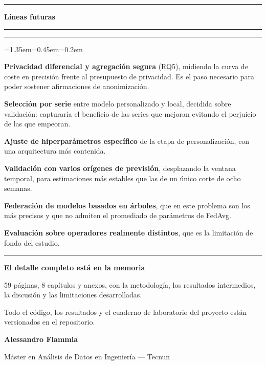 \documentclass[12pt]{article}
\newcommand{\seccionActual}{}
\newcommand{\diapo}[2]{%
  \typeout{MEDIDA pagina \thepage: usado=\the\pagetotal\space de \the\pagegoal}%
  \clearpage
  \renewcommand{\seccionActual}{#1}%
  {\color{azul}\rule{2.4cm}{2pt}}\par\vspace{0.38em}
  {\fontsize{18}{21}\selectfont\bfseries\color{tinta}#2}\par\vspace{0.3em}
  {\color{regla}\rule{\linewidth}{0.4pt}}\par\vspace{0.7em}
}
\newenvironment{puntos}[1][11.5]{%
  \begin{list}{\textcolor{azul}{\rule[0.28em]{0.5em}{1pt}}}%
    {\leftmargin=1.35em\itemsep=0.45em\parsep=0pt\topsep=0.2em
     \fontsize{#1}{15}\selectfont\color{grisTexto}}}%
  {\end{list}}
\begin{document}
\diapo{7. Conclusiones}{Líneas futuras}

\begin{minipage}[t]{0.53\linewidth}
\vspace{0pt}
\begin{puntos}
  \item \textbf{\color{tinta}Privacidad diferencial y agregación segura}
    (RQ5), midiendo la curva de coste en precisión frente al presupuesto de
    privacidad. Es el paso necesario para poder sostener afirmaciones de
    anonimización.
  \item \textbf{\color{tinta}Selección por serie} entre modelo personalizado y
    local, decidida sobre validación: capturaría el beneficio de las series que
    mejoran evitando el perjuicio de las que empeoran.
  \item \textbf{\color{tinta}Ajuste de hiperparámetros específico} de la etapa
    de personalización, con una arquitectura más contenida.
  \item \textbf{\color{tinta}Validación con varios orígenes de previsión},
    desplazando la ventana temporal, para estimaciones más estables que las de
    un único corte de ocho semanas.
  \item \textbf{\color{tinta}Federación de modelos basados en árboles}, que en
    este problema son los más precisos y que no admiten el promediado de
    parámetros de FedAvg.
  \item \textbf{\color{tinta}Evaluación sobre operadores realmente distintos},
    que es la limitación de fondo del estudio.
\end{puntos}
\end{minipage}\hfill
\begin{minipage}[t]{0.42\linewidth}
\vspace{1.2cm}
{\color{azul}\rule{3.2cm}{2.5pt}}\par\vspace{1.0em}
{\fontsize{15}{19}\selectfont\bfseries\color{tinta}%
El detalle completo está en la memoria\par}
\vspace{0.7em}
{\fontsize{11}{14.5}\selectfont\color{grisTexto}%
59 páginas, 8 capítulos y anexos, con la metodología, los resultados
intermedios, la discusión y las limitaciones desarrolladas.\par
\vspace{0.7em}
Todo el código, los resultados y el cuaderno de laboratorio del proyecto están
versionados en el repositorio.\par}
\vspace{1.4em}
{\fontsize{12}{15}\selectfont\bfseries\color{tinta}Alessandro Flammia\par}
{\fontsize{10.5}{13}\selectfont\color{grisTexto}Máster en Análisis de Datos en
Ingeniería --- Tecnun\par}
\end{minipage}
\end{document}
